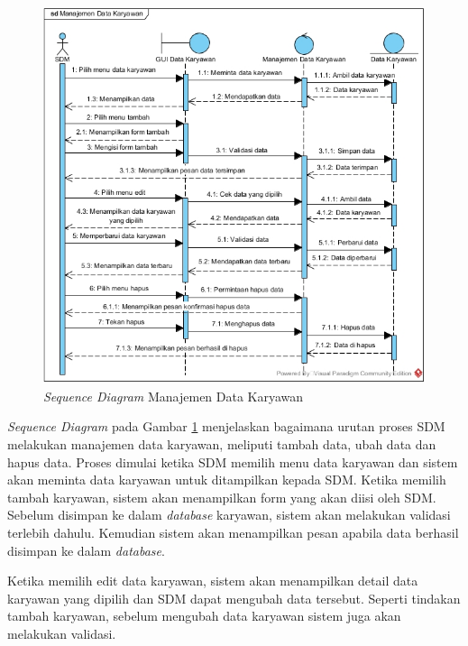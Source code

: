 \begin{enumerate}
\begin{figure}[H]
            		    \includegraphics[width=14cm]{gambar/sequence/manajemen-pegawai}
            		    \caption{\emph{Sequence Diagram} Manajemen Data Karyawan}
            		    \label{sequence_manajemen_pegawai}
            		\end{figure}
            		\emph{Sequence Diagram} pada Gambar \ref{sequence_manajemen_pegawai} menjelaskan bagaimana urutan proses SDM melakukan manajemen data karyawan, meliputi tambah data, ubah data dan hapus data. Proses dimulai ketika SDM memilih menu data karyawan dan sistem akan meminta data karyawan untuk ditampilkan kepada SDM. Ketika memilih tambah karyawan, sistem akan menampilkan form yang akan diisi oleh SDM. Sebelum disimpan ke dalam \emph{database} karyawan, sistem akan melakukan validasi terlebih dahulu. Kemudian sistem akan menampilkan pesan apabila data berhasil disimpan ke dalam \emph{database}.
            		
            		Ketika memilih edit data karyawan, sistem akan menampilkan detail data karyawan yang dipilih dan SDM dapat mengubah data tersebut. Seperti tindakan tambah karyawan, sebelum mengubah data karyawan sistem juga akan melakukan validasi.
            		

\end{enumerate}
